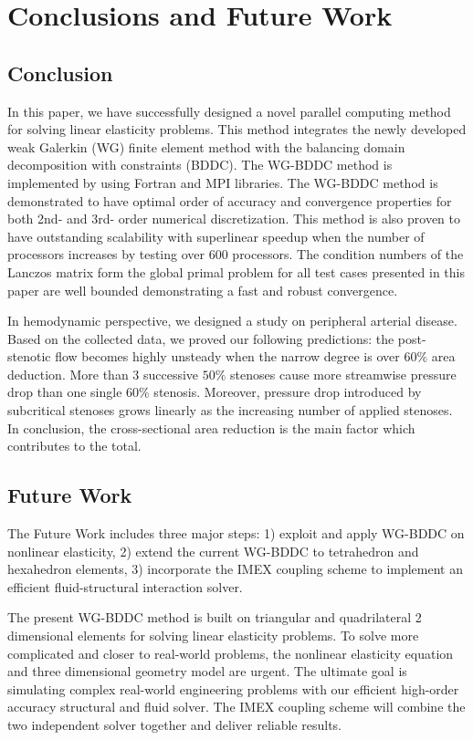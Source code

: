 \chapter{Conclusions and Future Work}

\section{Conclusion}

In this paper, we have successfully designed a novel parallel computing method for solving linear elasticity problems. This method integrates the newly developed weak Galerkin (WG) finite element method with the balancing domain decomposition with constraints (BDDC). The WG-BDDC method is implemented by using Fortran and MPI libraries. The WG-BDDC method is demonstrated to have optimal order of accuracy and convergence properties for both 2nd- and 3rd- order numerical discretization. This method is also proven to have outstanding scalability with superlinear speedup when the number of processors increases by testing over 600 processors. The condition numbers of the Lanczos matrix form the global primal problem for all test cases presented in this paper are well bounded demonstrating a fast and robust convergence.

In hemodynamic perspective, we designed a study on peripheral arterial disease. Based on the collected data, we proved our following predictions: the post-stenotic flow becomes highly unsteady when the narrow degree is over $ 60\% $ area deduction. More than 3 successive $ 50\% $ stenoses cause more streamwise pressure drop than one single $ 60\% $ stenosis. Moreover, pressure drop introduced by  subcritical stenoses grows linearly as the increasing number of applied stenoses. In conclusion, the cross-sectional area reduction is the main factor which contributes to the total.

\section{Future Work}

The Future Work includes three major steps: 1) exploit and apply WG-BDDC on nonlinear elasticity, 2) extend the current WG-BDDC to tetrahedron and hexahedron elements, 3) incorporate the IMEX coupling scheme to implement an efficient fluid-structural interaction solver.

The present WG-BDDC method is built on triangular and quadrilateral 2 dimensional elements for solving linear elasticity problems. To solve more complicated and closer to real-world problems, the nonlinear elasticity equation and three dimensional geometry model are urgent. The ultimate goal is simulating complex real-world engineering problems with our efficient high-order accuracy structural and fluid solver. The IMEX coupling scheme will combine the two independent solver together and deliver reliable results.